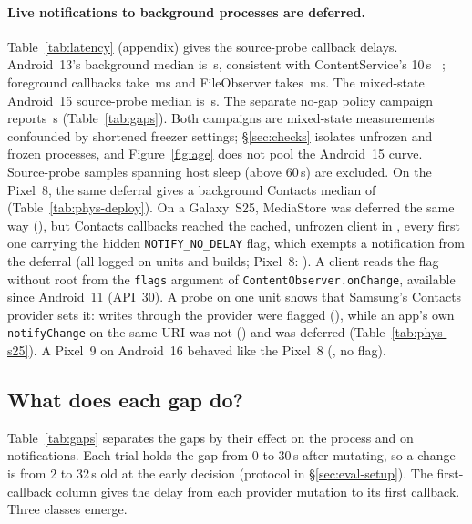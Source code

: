 \paragraph{Live notifications to background processes are deferred.} Table~\ref{tab:latency} (appendix) gives the source-probe callback delays. Android~13's background median is \ProvLatA\,s, consistent with ContentService's 10\,s ~\cite{aosp_contentservice}; foreground callbacks take \FgLatMs\,ms and FileObserver takes \FileLatMs\,ms. The mixed-state Android~15 source-probe median is \ProvLatB\,s. The separate no-gap policy campaign reports \FclApiNone\,s (Table~\ref{tab:gaps}). Both campaigns are mixed-state measurements confounded by shortened freezer settings; \S\ref{sec:checks} isolates unfrozen and frozen processes, and Figure~\ref{fig:age} does not pool the Android~15 curve. Source-probe samples spanning host sleep (\LatDropped above 60\,s) are excluded. On the Pixel~8, the same deferral gives a background Contacts median of \PhysDeployBgMedian (Table~\ref{tab:phys-deploy}).\ifPhysSamsung{} On a Galaxy~S25, MediaStore was deferred the same way (\PhysSamsungMediaBgMedian), but Contacts callbacks reached the cached, unfrozen client in \PhysSamsungBgMedian, every first one carrying the hidden \texttt{NOTIFY\_NO\_DELAY} flag, which exempts a notification from the deferral (all \PhysSamsungFlagCallbacks logged on \PhysSamsungFlagUnits units and \PhysSamsungFlagBuilds builds; Pixel~8: \PhysDeployNoDelay). A client reads the flag without root from the \texttt{flags} argument of \texttt{ContentObserver.onChange}, available since Android~11 (API~30). A probe on one unit shows that Samsung's Contacts provider sets it: writes through the provider were flagged (\PhysSamsungFlagWrites), while an app's own \texttt{notifyChange} on the same URI was not (\PhysSamsungFlagNotify) and was deferred (Table~\ref{tab:phys-s25}).\fi\ifPhysNine{} A Pixel~9 on Android~16 behaved like the Pixel~8 (\PhysNineBgMedian, no flag).\fi

\subsection{What does each gap do?}
\label{sec:meas-gaps}



Table~\ref{tab:gaps} separates the gaps by their effect on the process and on notifications. Each trial holds the gap from 0 to 30\,s after mutating, so a change is from 2 to 32\,s old at the early decision (protocol in \S\ref{sec:eval-setup}). The first-callback column gives the delay from each provider mutation to its first callback. Three classes emerge.

